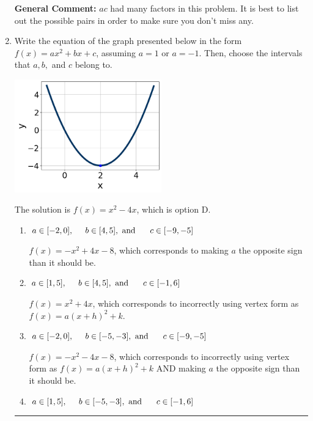 \documentclass{extbook}[14pt]
\newcommand{\litem}[1]{\item #1

\rule{\textwidth}{0.4pt}}
\begin{document}
\begin{enumerate}
{\textbf{General Comment:} $ac$ had many factors in this problem. It is best to list out the possible pairs in order to make sure you don't miss any.
}
\litem{
Write the equation of the graph presented below in the form $f(x)=ax^2+bx+c$, assuming  $a=1$ or $a=-1$. Then, choose the intervals that $a, b,$ and $c$ belong to.

\begin{center}
    \includegraphics[width=0.5\textwidth]{../Figures/quadraticGraphToEquationB.png}
\end{center}


The solution is \( f(x) = x^{2} -4 x \), which is option D.\begin{enumerate}[label=\Alph*.]
\item \( a \in [-2, 0], \hspace*{5mm} b \in [4, 5], \text{ and } \hspace*{5mm} c \in [-9, -5] \)

$f(x)=-x^{2} +4 x -8$, which corresponds to making $a$ the opposite sign than it should be.
\item \( a \in [1, 5], \hspace*{5mm} b \in [4, 5], \text{ and } \hspace*{5mm} c \in [-1, 6] \)

$f(x)=x^{2} +4 x$, which corresponds to incorrectly using vertex form as $f(x) = a(x+h)^2+k$.
\item \( a \in [-2, 0], \hspace*{5mm} b \in [-5, -3], \text{ and } \hspace*{5mm} c \in [-9, -5] \)

$f(x)=-x^{2} -4 x -8$, which corresponds to incorrectly using vertex form as $f(x) = a(x+h)^2+k$ AND making $a$ the opposite sign than it should be.
\item \( a \in [1, 5], \hspace*{5mm} b \in [-5, -3], \text{ and } \hspace*{5mm} c \in [-1, 6] \)


\end{enumerate}}
\end{enumerate}
\end{document}

